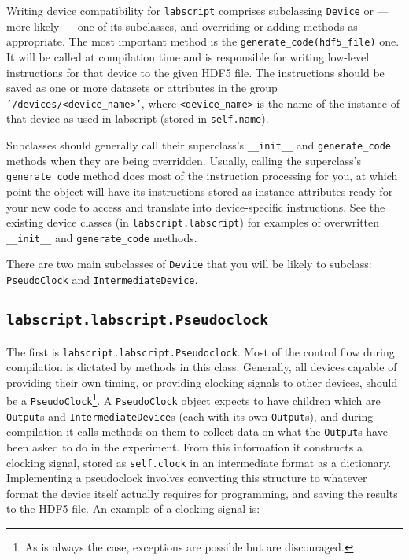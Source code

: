 \documentclass[a4paper,11pt,titlepage]{article}
\begin{document}
Writing device compatibility for \texttt{labscript} comprises subclassing \texttt{Device} or --- more likely --- one of its subclasses, and overriding or adding methods as appropriate. The most important method is the \texttt{generate\_code(hdf5\_file)} one. It will be called at compilation time and is responsible for writing low-level instructions for that device to the given HDF5 file. The instructions should be saved as one or more datasets or attributes in the group \texttt{'/devices/<device\_name>'}, where \texttt{<device\_name>} is the name of the instance of that device as used in labscript (stored in \texttt{self.name}).

Subclasses should generally call their superclass's \texttt{\_\_init\_\_} and \texttt{generate\_code} methods when they are being overridden. Usually, calling the superclass's \texttt{generate\_code} method does most of the instruction processing for you, at which point the object will have its instructions stored as instance attributes ready for your new code to access and translate into device-specific instructions. See the existing device classes (in \texttt{labscript.labscript}) for examples of overwritten \texttt{\_\_init\_\_} and \texttt{generate\_code} methods.

There are two main subclasses of \texttt{Device} that you will be likely to subclass: \texttt{PseudoClock} and \texttt{IntermediateDevice}.

\subsection{\texttt{labscript.labscript.Pseudoclock}}\label{sec:pseudoclock}
The first is \texttt{labscript.labscript.Pseudoclock}. Most of the control flow during compilation is dictated by methods in this class. Generally, all devices capable of providing their own timing, or providing clocking signals to other devices, should be a \texttt{PseudoClock}\footnote{As is always the case, exceptions are possible but are discouraged.}. A \texttt{PseudoClock} object expects to have children which are  \texttt{Output}s and \texttt{IntermediateDevice}s (each with its own \texttt{Output}s), and during compilation it calls methods on them to collect data on what the \texttt{Output}s have been asked to do in the experiment. From this information it constructs a clocking signal, stored as \texttt{self.clock} in an intermediate format as a dictionary. Implementing a pseudoclock involves converting this structure to whatever format the device itself actually requires for programming, and saving the results to the HDF5 file. An example of a clocking signal is:
 
\end{document}
